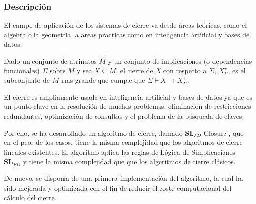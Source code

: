 \subsubsection{Descripci\'on} 



El campo de aplicaci\'on de los sistemas de cierre va desde \'areas te\'oricas, como el algebra o la geometria, a \'areas practicas como en inteligencia artificial y bases de datos.

Dado un conjunto de atrinutos \( M \) y un conjunto de implicaciones (o dependencias funcionales) \( \Sigma \) sobre \( M \) y sea \( X \subseteq M \), el cierre de \( X \) con respecto a \( \Sigma \), \( X^+_{\Sigma} \), es el subconjunto de \( M \) mas grande que cumple que \( \Sigma \vdash X \to X^+_{\Sigma} \).

El cierre es ampliamente usado en inteligencia artificial y bases de datos ya que es un punto clave en la resoluci\'on de muchos problemas: eliminaci\'on de restricciones redundantes, optimizaci\'on de consultas y el problema de la b\'usqueda de claves.

Por ello, se ha desarrollado un algoritmo de cierre, llamado \(\textbf{SL}_{FD}\)-Closure \cite{Mora2012a}, que en el peor de los casos, tiene la misma complejidad que los algoritmos de cierre lineales existentes.
El algoritmo aplica las reglas de L\'ogica de Simplicaciones \(\textbf{SL}_{FD}\) \cite{Cordero2002} y tiene la misma complejidad que que los algoritmos de cierre cl\'asicos.

De nuevo, se dispon\'ia de una primera implementaci\'on del algoritmo, la cual ha sido mejorada y optimizada con el fin de reducir el coste computacional del c\'alculo del cierre.

